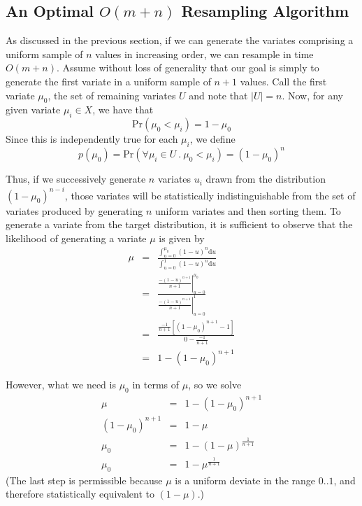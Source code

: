 \documentclass{article}
\newcommand{\Prob}{\text{Pr}}
\newcommand{\du}{{\text{d}u}}
\begin{document}
\subsection{An Optimal $O(m + n)$ Resampling Algorithm}\label{sec-optimal}

  As discussed in the previous section, if we can generate
  the variates comprising a uniform sample of $n$ values in
  increasing order, we can resample in time $O(m + n)$.
  Assume without loss of generality that our goal is simply
  to generate the first variate in a uniform sample of $n +
  1$ values.  Call the first variate $\mu_0$, the set of
  remaining variates $U$ and note that $|U|=n$.  Now, for
  any given variate $\mu_i \in X$, we have that
    $$ \Prob(\mu_0 < \mu_i) = 1 - \mu_0 $$
  Since this is independently true for each $\mu_i$, we define
    $$p(\mu_0) = \Prob(\forall \mu_i \in U ~.~ \mu_0 < \mu_i) = (1 - \mu_0)^n$$
  
  Thus, if we successively generate $n$ variates $u_i$ drawn from the
  distribution $(1 - \mu_0)^{n-i}$, those variates will be statistically
  indistinguishable from the set of variates produced by generating $n$
  uniform variates and then sorting them.  To generate a
  variate from the target distribution, it is sufficient to
  observe that the likelihood of generating a variate $\mu$
  is given by
    \begin{eqnarray*}
      \mu &=& \frac{\int_{u=0}^{\mu_0}{(1-u)^n \du}}
                   {\int_{u=0}^{1}{(1-u)^n \du}} \\
	  &=& \frac{\left.\frac{-(1-u)^{n+1}}{n+1}\right|_{u=0}^{\mu_0}}
		   {\left.\frac{-(1-u)^{n+1}}{n+1}\right|_{u=0}^{1}} \\
          &=& \frac{\frac{-1}{n+1}\left[(1-\mu_0)^{n+1}-1\right]}
		   {0-\frac{-1}{n+1}} \\
          &=& 1 - (1 - \mu_0)^{n+1}
    \end{eqnarray*}

  However, what we need is $\mu_0$ in terms of
  $\mu$, so we solve
    \begin{eqnarray*}
       \mu &=& 1 - (1 - \mu_0)^{n+1} \\
       (1 - \mu_0)^{n+1} &=& 1 - \mu \\
       \mu_0 &=& 1 - (1 - \mu)^\frac{1}{n+1} \\
       \mu_0 &=& 1 - \mu^\frac{1}{n+1}
    \end{eqnarray*}
  (The last step is permissible because $\mu$ is a
  uniform deviate in the range $0..1$, and therefore
  statistically equivalent to $(1-\mu)$.)
\end{document}
